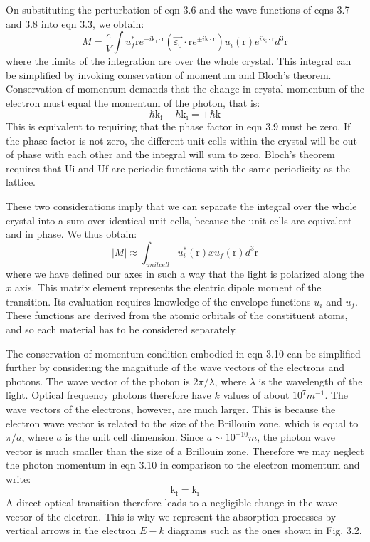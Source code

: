\documentclass[12pt]{book}
\begin{document}
On substituting the perturbation of eqn 3.6 and the wave functions of eqns 3.7 and 3.8 into eqn 3.3, we obtain:
\begin{equation}\label{equa:3.9}
  M=\frac{e}{V}\int u_f^*{\mathrm{r}}e^{-i\mathrm{k_f}\cdot\mathrm{r}}(\vec{\varepsilon_0}\cdot\mathrm{r}e^{\pm i\mathrm{k}\cdot\mathrm{r}})u_i(\mathrm{r})e^{i\mathrm{k_i}\cdot\mathrm{r}}d^3\mathrm{r}
\end{equation}
where the limits of the integration are over the whole crystal. This integral can be simplified by invoking conservation of momentum and Bloch's theorem. Conservation of momentum demands that the change in crystal momentum of the electron must equal the momentum of the photon, that is:
\begin{equation}\label{equa:3.10}
  \hbar\mathrm{k_f}-\hbar\mathrm{k_i}=\pm\hbar\mathrm{k}
\end{equation}
This is equivalent to requiring that the phase factor in eqn 3.9 must be zero. If the phase factor is not zero, the different unit cells within the crystal will be out of phase with each other and the integral will sum to zero. Bloch's theorem requires that Ui and Uf are periodic functions with the same periodicity as the lattice.

These two considerations imply that we can separate the integral over the whole crystal into a sum over identical unit cells, because the unit cells are equivalent and in phase. We thus obtain:
\begin{equation}\label{equa:3.11}
  |M|\approx\int_{unit cell}u_i^*(\mathrm{r})xu_f(\mathrm{r})d^3\mathrm{r}
\end{equation}
where we have defined our axes in such a way that the light is polarized along the $x$ axis. This matrix element represents the electric dipole moment of the transition. Its evaluation requires knowledge of the envelope functions $u_i$ and $u_f$. These functions are derived from the atomic orbitals of the constituent atoms, and so each material has to be considered separately.

The conservation of momentum condition embodied in eqn 3.10 can be simplified further by considering the magnitude of the wave vectors of the electrons and photons. The wave vector of the photon is $2\pi/\lambda$, where $\lambda$ is the wavelength of the light. Optical frequency photons therefore have $k$ values of about $10^7 m^{-1}$. The wave vectors of the electrons, however, are much larger. This is because the electron wave vector is related to the size of the Brillouin zone, which is equal to $\pi/a$, where $a$ is the unit cell dimension. Since $a\sim 10^{-10} m$, the photon wave vector is much smaller than the size of a Brillouin zone. Therefore we may neglect the photon momentum in eqn 3.10 in comparison to the electron momentum and write:
\begin{equation}\label{3.12}
  \mathrm{k_f}=\mathrm{k_i}
\end{equation}
A direct optical transition therefore leads to a negligible change in the wave vector of the electron. This is why we represent the absorption processes by vertical arrows in the electron $E-k$ diagrams such as the ones shown in Fig. 3.2.
\end{document}
